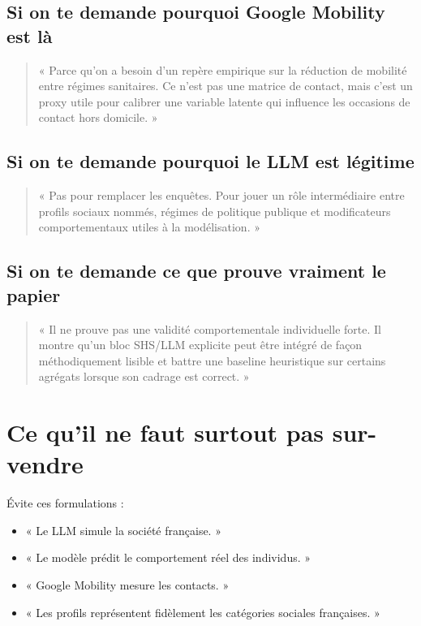 \documentclass[11pt,a4paper]{article}
\begin{document}
\subsection*{Si on te demande pourquoi Google Mobility est là}
\begin{quote}
« Parce qu'on a besoin d'un repère empirique sur la réduction de mobilité entre régimes sanitaires. Ce n'est pas une matrice de contact, mais c'est un proxy utile pour calibrer une variable latente qui influence les occasions de contact hors domicile. »
\end{quote}

\subsection*{Si on te demande pourquoi le LLM est légitime}
\begin{quote}
« Pas pour remplacer les enquêtes. Pour jouer un rôle intermédiaire entre profils sociaux nommés, régimes de politique publique et modificateurs comportementaux utiles à la modélisation. »
\end{quote}

\subsection*{Si on te demande ce que prouve vraiment le papier}
\begin{quote}
« Il ne prouve pas une validité comportementale individuelle forte. Il montre qu'un bloc SHS/LLM explicite peut être intégré de façon méthodiquement lisible et battre une baseline heuristique sur certains agrégats lorsque son cadrage est correct. »
\end{quote}

\section{Ce qu'il ne faut surtout pas sur-vendre}

Évite ces formulations :
\begin{itemize}
\item « Le LLM simule la société française. »
\item « Le modèle prédit le comportement réel des individus. »
\item « Google Mobility mesure les contacts. »
\item « Les profils représentent fidèlement les catégories sociales françaises. »
\end{itemize}
\end{document}
